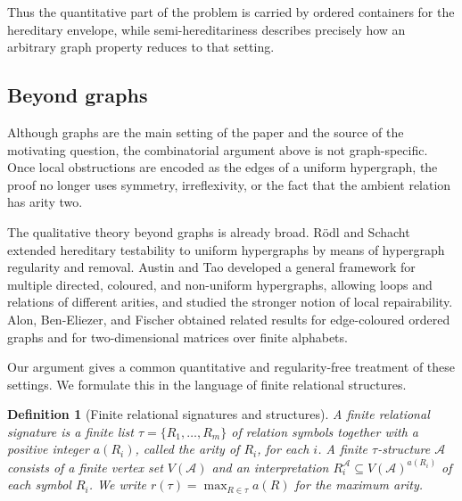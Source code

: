 \documentclass[11pt,reqno,letterpaper]{amsart}
\newcommand{\cA}{{\mathcal A}}
\theoremstyle{plain}
\newtheorem{defn}[thm]{Definition}
\theoremstyle{remark}
\begin{document}
Thus the quantitative part of the problem is carried by ordered containers for the hereditary envelope, while semi-hereditariness describes precisely how an arbitrary graph property reduces to that setting.

\subsection{Beyond graphs}

Although graphs are the main setting of the paper and the source of the motivating question, the combinatorial argument above is not graph-specific. Once local obstructions are encoded as the edges of a uniform hypergraph, the proof no longer uses symmetry, irreflexivity, or the fact that the ambient relation has arity two.

The qualitative theory beyond graphs is already broad. Rödl and Schacht \cite{RodlSchacht} extended hereditary testability to uniform hypergraphs by means of hypergraph regularity and removal. Austin and Tao \cite{AustinTao} developed a general framework for multiple directed, coloured, and non-uniform hypergraphs, allowing loops and relations of different arities, and studied the stronger notion of local repairability. Alon, Ben-Eliezer, and Fischer \cite{AlonBenEliezerFischer} obtained related results for edge-coloured ordered graphs and for two-dimensional matrices over finite alphabets.

Our argument gives a common quantitative and regularity-free treatment of these settings. We formulate this in the language of finite relational structures.

\begin{defn}[Finite relational signatures and structures]
\label{def:finite-relational-signature}
 A \textit{finite relational signature} is a finite list $\tau=\{R_1,\dots,R_m\}$ of relation symbols together with a positive integer
$a(R_i)$, called the \textit{arity} of $R_i$, for each $i$.  A finite
$\tau$-structure $\cA$ consists of a finite vertex set $V(\cA)$ and an
interpretation
\(R_i^{\cA}\subseteq V(\cA)^{a(R_i)}\)
of each symbol $R_i$.  We write
$r(\tau)=\max_{R\in\tau}a(R)$ for the maximum arity.
\end{defn}
\end{document}
